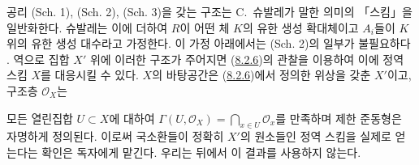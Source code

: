 \begin{env}[8.3.2]
\label{I.8.3.2-ko}
공리 (Sch. 1), (Sch. 2), (Sch. 3)을 갖는 구조는 C.~슈발레가 말한
의미의 「스킴」을 일반화한다. 슈발레는 이에 더하여 $R$이 어떤 체
$K$의 유한 생성 확대체이고 $A_i$들이 $K$ 위의 유한 생성
대수라고 가정한다. 이 가정 아래에서는 (Sch. 2)의 일부가 불필요하다
\cite{I-1}. 역으로 집합 $X'$ 위에 이러한 구조가 주어지면
(\hyperref[I.8.2.6-ko]{8.2.6})의 관찰을 이용하여 이에 정역 스킴 $X$를
대응시킬 수 있다. $X$의 바탕공간은
(\hyperref[I.8.2.6-ko]{8.2.6})에서 정의한 위상을 갖춘 $X'$이고,
구조층 $\mathscr{O}_X$는

모든 열린집합 $U\subset X$에 대하여
$\Gamma(U,\mathscr{O}_X)=\bigcap_{x\in U}\mathscr{O}_x$를 만족하며
제한 준동형은 자명하게 정의된다. 이로써 국소환들이 정확히 $X'$의
원소들인 정역 스킴을 실제로 얻는다는 확인은 독자에게 맡긴다. 우리는
뒤에서 이 결과를 사용하지 않는다.
\end{env}

